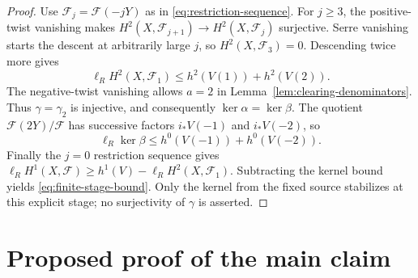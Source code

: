 \documentclass[11pt,reqno]{amsart}
\numberwithin{equation}{section}
\theoremstyle{definition}
\theoremstyle{remark}
\newcommand{\FF}{\mathcal F}
\newcommand{\len}{\ell}
\begin{document}
\begin{proof}
Use $\FF_j=\FF(-jY)$ as in \eqref{eq:restriction-sequence}.
For $j\geq3$, the positive-twist vanishing makes
$H^2(X,\FF_{j+1})\to H^2(X,\FF_j)$ surjective. Serre vanishing
starts the descent at arbitrarily large $j$, so $H^2(X,\FF_3)=0$.
Descending twice more gives
\[
 \len_R H^2(X,\FF_1)\leq h^2(V(1))+h^2(V(2)).
\]
The negative-twist vanishing allows $a=2$ in
Lemma~\ref{lem:clearing-denominators}. Thus $\gamma=\gamma_2$ is
injective, and consequently $\ker\alpha=\ker\beta$.
The quotient $\FF(2Y)/\FF$ has successive factors $i_*V(-1)$ and
$i_*V(-2)$, so
\[
 \len_R\ker\beta\leq h^0(V(-1))+h^0(V(-2)).
\]
Finally the $j=0$ restriction sequence gives
$\len_R H^1(X,\FF)\geq h^1(V)-\len_R H^2(X,\FF_1)$.
Subtracting the kernel bound yields \eqref{eq:finite-stage-bound}.
Only the kernel from the fixed source stabilizes at this explicit
stage; no surjectivity of $\gamma$ is asserted.
\end{proof}

\section{Proposed proof of the main claim}\label{sec:main-proof}
\end{document}
